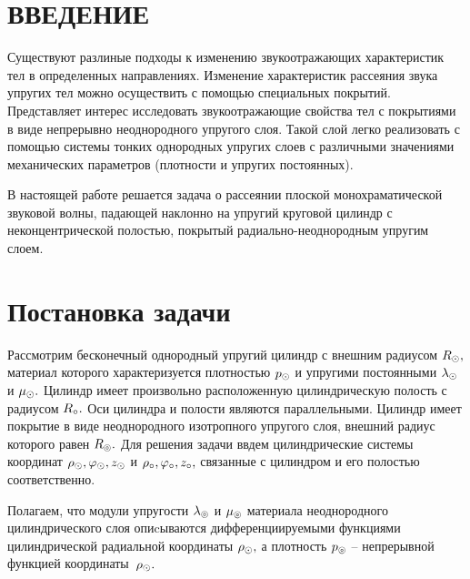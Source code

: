 

\renewcommand{\bibname}{СПИСОК ИСПОЛЬЗОВАННЫХ ИСТОЧНИКОВ}
\renewcommand\refname{СПИСОК ИСПОЛЬЗОВАННЫХ ИСТОЧНИКОВ}

%

\setcounter{page}{2}
\thispagestyle {empty}
\renewcommand{\contentsname}{\centering СОДЕРЖАНИЕ}
\tableofcontents

\newpage
\section*{ВВЕДЕНИЕ}

Существуют разлиные подходы к изменению звукоотражающих характеристик тел в определенных направлениях. Изменение характеристик рассеяния звука упругих тел можно осуществить с помощью специальных покрытий. Представляет интерес исследовать звукоотражающие свойства тел с покрытиями в виде непрерывно неоднородного упругого слоя. Такой слой легко реализовать с помощью системы тонких однородных упругих слоев с различными значениями механических параметров (плотности и упругих постоянных).

В настоящей работе решается задача о рассеянии плоской монохраматической звуковой волны, падающей наклонно на упругий круговой цилиндр с неконцентрической полостью, покрытый радиально-неоднородным упругим слоем.

\newpage
\section{Постановка задачи} 

Рассмотрим бесконечный однородный упругий цилиндр с внешним радиусом $R_\odot,$ материал которого характеризуется плотностью $p_\odot$ и упругими постоянными $\lambda_\odot$ и $\mu_\odot.$ Цилиндр имеет произвольно расположенную цилиндрическую полость с радиусом $R_\circ.$ Оси цилиндра и полости являются параллельными. Цилиндр имеет покрытие в виде неоднородного изотропного упругого слоя, внешний радиус которого равен $R_\circledcirc.$ Для решения задачи ввдем цилиндрические системы координат $\rho_\odot, \varphi_\odot, z_\odot$ и $\rho_\circ, \varphi_\circ, z_\circ,$ связанные с цилиндром и его полостью соответственно.

Полагаем, что модули упругости $\lambda_\circledcirc$ и $\mu_\circledcirc$ материала неоднородного цилиндрического слоя опиcываются дифференциируемыми функциями цилиндрической радиальной координаты $\rho_\odot,$ а плотность $p_\circledcirc$ -- непрерывной функцией координаты~$\rho_\odot.$ 

